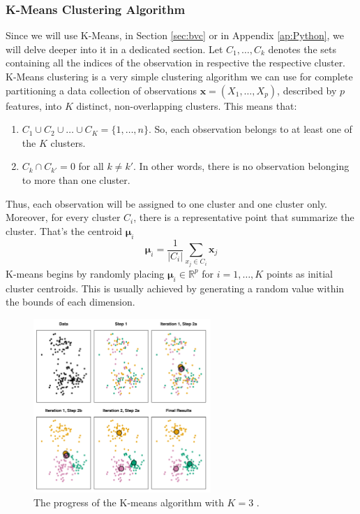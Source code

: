 \subsubsection{K-Means Clustering Algorithm}
\label{sss:kmeans}
Since we will use K-Means, in Section \ref{sec:bvc} or in Appendix \ref{ap:Python}, we will delve deeper into it in a dedicated section. Let $C_1,\dots,C_k$ denotes the sets containing all the indices of the observation in respective the respective cluster. K-Means clustering is a very simple clustering algorithm we can use for complete partitioning a data collection of observations $\mathbf{x}=\left(X_1, \dots, X_p \right)$, described by $p$ features, into $K$ distinct, non-overlapping clusters. This means that:
\begin{enumerate}
    \item $C_1 \cup C_2 \cup \dots \cup C_K=\{1,\dots,n\}$. So, each observation belongs to at least one of the $K$ clusters.
    \item $C_k\cap C_{k'}=0$ for all $k\neq k'$. In other words, there is no observation belonging to more than one cluster.
\end{enumerate}
Thus, each observation will be assigned to one cluster and one cluster only. Moreover, for every cluster $C_i$, there is a representative point that summarize the cluster. That's the centroid $\bm{\mu}_i$
\begin{equation}
    \label{eq:centroid}
    \boldsymbol{\mu}_i=\frac{1}{\left|C_i\right|} \sum_{x_j \in C_i} \mathbf{x}_j
\end{equation}
K-means begins by randomly placing $\bm{\mu}_i \in \mathbb{R}^p$ for $i=1,\dots,K$ points as initial cluster centroids. This is usually achieved by generating a random value within the bounds of each dimension. 
\begin{figure}[H]
    \centering
    \includegraphics[width=0.6\textwidth]{Images/clustiteration.png}
    \caption[K-Means clustering iterations.]{The progress of the K-means algorithm with $K=3$ \cite{james_introduction_2021}.}
    \label{fig:clustiteration}
\end{figure}
